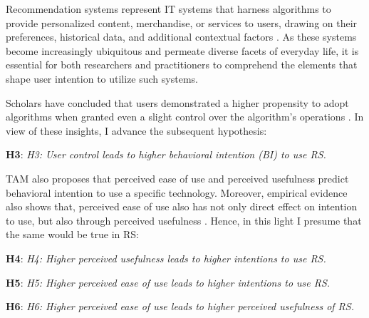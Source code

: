 \documentclass[a4paper,12pt]{article}
\begin{document}
Recommendation systems represent IT systems that harness algorithms to provide personalized content, merchandise, or services to users, drawing on their preferences, historical data, and additional contextual factors \citep{portugal2018use}. As these systems become increasingly ubiquitous and permeate diverse facets of everyday life, it is essential for both researchers and practitioners to comprehend the elements that shape user intention to utilize such systems.

Scholars have concluded that users demonstrated a higher propensity to adopt algorithms when granted even a slight control over the algorithm's operations \citep{dietvorstEtAl18}. In view of these insights, I advance the subsequent hypothesis:

\textbf{H3}: \textit{H3: User control leads to higher behavioral intention (BI) to use RS.}

TAM also proposes that perceived ease of use and perceived usefulness predict behavioral intention to use a specific technology. Moreover, empirical evidence also shows that, perceived ease of use also has not only direct effect on intention to use, but also through perceived usefulness \citep{davisPerceivedUsefulnessPerceived1989}. Hence, in this light I presume that the same would be true in RS: 

\textbf{H4}: \textit{H4: Higher perceived usefulness leads to higher intentions to use RS.}

\textbf{H5}: \textit{H5: Higher perceived ease of use leads to higher intentions to use RS.}

\textbf{H6}: \textit{H6: Higher perceived ease of use leads to higher perceived usefulness of RS.}
\end{document}
